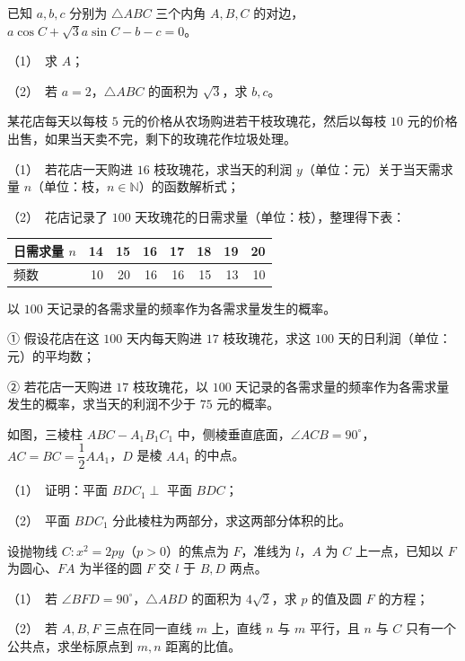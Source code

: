 \begin{question}
已知 $a,b,c$ 分别为 $\triangle ABC$ 三个内角 $A,B,C$ 的对边，$a\cos C+\sqrt3a\sin C-b-c=0$。

（1）　求 $A$；

（2）　若 $a=2$，$\triangle ABC$ 的面积为 $\sqrt3$，求 $b,c$。

\end{question}
\begin{question}
某花店每天以每枝 $5$ 元的价格从农场购进若干枝玫瑰花，然后以每枝 $10$ 元的价格出售，如果当天卖不完，剩下的玫瑰花作垃圾处理。

（1）　若花店一天购进 $16$ 枝玫瑰花，求当天的利润 $y$（单位：元）关于当天需求量 $n$（单位：枝，$n\in\mathbb N$）的函数解析式；

（2）　花店记录了 $100$ 天玫瑰花的日需求量（单位：枝），整理得下表：

\begin{center}
\begingroup\setlength{\tabcolsep}{4pt}
\begin{tabular}{lrrrrrrr}
\toprule
日需求量 $n$ & 14 & 15 & 16 & 17 & 18 & 19 & 20 \\
\midrule
频数 & 10 & 20 & 16 & 16 & 15 & 13 & 10 \\
\bottomrule
\end{tabular}
\endgroup
\end{center}

以 $100$ 天记录的各需求量的频率作为各需求量发生的概率。

① 假设花店在这 $100$ 天内每天购进 $17$ 枝玫瑰花，求这 $100$ 天的日利润（单位：元）的平均数；

② 若花店一天购进 $17$ 枝玫瑰花，以 $100$ 天记录的各需求量的频率作为各需求量发生的概率，求当天的利润不少于 $75$ 元的概率。

\end{question}
\begin{question}
如图，三棱柱 $ABC-A_1B_1C_1$ 中，侧棱垂直底面，$\angle ACB=90^\circ$，$AC=BC=\dfrac12AA_1$，$D$ 是棱 $AA_1$ 的中点。

（1）　证明：平面 $BDC_1\perp$ 平面 $BDC$；

（2）　平面 $BDC_1$ 分此棱柱为两部分，求这两部分体积的比。

\end{question}
\begin{question}
设抛物线 $C:x^2=2py$（$p>0$）的焦点为 $F$，准线为 $l$，$A$ 为 $C$ 上一点，已知以 $F$ 为圆心、$FA$ 为半径的圆 $F$ 交 $l$ 于 $B,D$ 两点。

（1）　若 $\angle BFD=90^\circ$，$\triangle ABD$ 的面积为 $4\sqrt2$，求 $p$ 的值及圆 $F$ 的方程；

（2）　若 $A,B,F$ 三点在同一直线 $m$ 上，直线 $n$ 与 $m$ 平行，且 $n$ 与 $C$ 只有一个公共点，求坐标原点到 $m,n$ 距离的比值。

\end{question}
